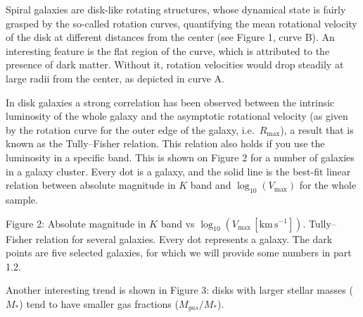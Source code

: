 Spiral galaxies are disk-like rotating structures, whose dynamical state is
fairly grasped by the so-called rotation curves, quantifying the mean
rotational velocity of the disk at different distances from the center (see
Figure 1, curve B). An interesting feature is the flat region of the curve,
which is attributed to the presence of dark matter. Without it, rotation
velocities would drop steadily at large radii from the center, as depicted in
curve A.


In disk galaxies a strong correlation has been observed between the intrinsic
luminosity of the whole galaxy and the asymptotic rotational velocity (as
given by the rotation curve for the outer edge of the galaxy, i.e.\
$R_{\max}$), a result that is known as the Tully--Fisher relation. This
relation also holds if you use the luminosity in a specific band. This is
shown on Figure 2 for a number of galaxies in a galaxy cluster. Every dot is a
galaxy, and the solid line is the best-fit linear relation between absolute
magnitude in $K$ band and $\log_{10}(V_{\max})$ for the whole sample.


{\centering\small Figure 2: Absolute magnitude in $K$ band vs
$\log_{10}(V_{\max}\,[\mathrm{km\,s^{-1}}])$. Tully--Fisher relation for
several galaxies. Every dot represents a galaxy. The dark points are five
selected galaxies, for which we will provide some numbers in part 1.2.\par}

Another interesting trend is shown in Figure 3: disks with larger stellar
masses ($M_*$) tend to have smaller gas fractions ($M_{gas}/M_*$).


